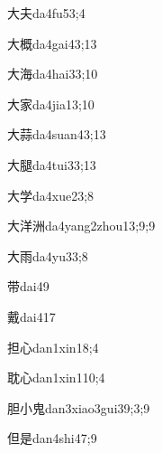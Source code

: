 \begin{verbete}{大夫}{da4fu5}{3;4}
\end{verbete}
\begin{verbete}{大概}{da4gai4}{3;13}
\end{verbete}
\begin{verbete}{大海}{da4hai3}{3;10}
\end{verbete}
\begin{verbete}{大家}{da4jia1}{3;10}
\end{verbete}
\begin{verbete}{大蒜}{da4suan4}{3;13}
\end{verbete}
\begin{verbete}{大腿}{da4tui3}{3;13}
\end{verbete}
\begin{verbete}{大学}{da4xue2}{3;8}
\end{verbete}
\begin{verbete}{大洋洲}{da4yang2zhou1}{3;9;9}
\end{verbete}
\begin{verbete}{大雨}{da4yu3}{3;8}
\end{verbete}
\begin{verbete}{带}{dai4}{9}
\end{verbete}
\begin{verbete}{戴}{dai4}{17}
\end{verbete}
\begin{verbete}{担心}{dan1xin1}{8;4}
\end{verbete}
\begin{verbete}{耽心}{dan1xin1}{10;4}
\end{verbete}
\begin{verbete}{胆小鬼}{dan3xiao3gui3}{9;3;9}
\end{verbete}
\begin{verbete}{但是}{dan4shi4}{7;9}
\end{verbete}
